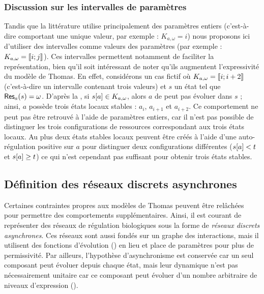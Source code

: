 
\subsubsection*{Discussion sur les intervalles de paramètres}
Tandis que la littérature utilise principalement des paramètres entiers
(c'est-à-dire comportant une unique valeur, par exemple : $K_{a,\omega} = i$)
nous proposons ici d'utiliser des intervalles comme valeurs des paramètres
(par exemple : $K_{a,\omega} = \mathopen{\llbracket}i\mathclose{};j\mathclose{\rrbracket}$).
Ces intervalles permettent notamment de faciliter la représentation,
bien qu'il soit intéressant de noter qu'ils augmentent l'expressivité du modèle de Thomas.
En effet, considérons un cas fictif où $K_{a,\omega} = \mathopen{\llbracket}i\mathclose{};i+2\mathclose{\rrbracket}$
(c'est-à-dire un intervalle contenant trois valeurs) et $s$ un état tel que
$\mathsf{Res}_{a}(s) = \omega$.
D'après la , si ${s[a]} \in K_{a,\omega}$, alors $a$
de peut pas évoluer dans $s$ ; ainsi, $a$ possède trois états locaux stables :
$a_i$, $a_{i+1}$ et $a_{i+2}$.
Ce comportement ne peut pas être retrouvé à l'aide de paramètres entiers,
car il n'est pas possible de distinguer les trois configurations de ressources
correspondant aux trois états locaux.
Au plus deux états stables locaux peuvent être créés à l'aide d'une auto-régulation positive
sur $a$ pour distinguer deux configurations différentes
(${s[a]} < t$ et ${s[a]} \geq t$)
ce qui n'est cependant pas suffisant pour obtenir trois états stables.



\subsection{Définition des réseaux discrets asynchrones}

Certaines contraintes propres aux modèles de Thomas peuvent être relâchées pour permettre
des comportements supplémentaires.
Ainsi, il est courant de représenter des réseaux de régulation biologiques
sous la forme de \emph{réseaux discrets asynchrones}.
Ces réseaux sont aussi fondés sur un graphe des interactions,
mais il utilisent des fonctions d'évolution () en lieu et place de paramètres
pour plus de permissivité.
Par ailleurs, l'hypothèse d'asynchronisme est conservée car un seul composant peut évoluer
depuis chaque état,
mais leur dynamique n'est pas nécessairement unitaire 
car ce composant peut évoluer d'un nombre arbitraire de niveaux d'expression
().


